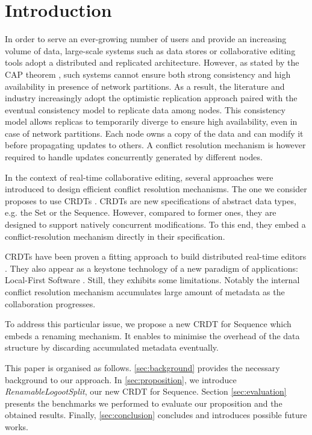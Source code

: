 \documentclass[sigplan,10pt]{acmart}
\begin{document}
\section{Introduction}

In order to serve an ever-growing number of users and provide an increasing volume of data, large-scale systems such as data stores or collaborative editing tools adopt a distributed and replicated architecture.
However, as stated by the CAP theorem \cite{brewer_2000_podc}, such systems cannot ensure both strong consistency and high availability in presence of network partitions.
As a result, the literature and industry increasingly adopt the optimistic replication approach \cite{10.1145/1057977.1057980} paired with the eventual consistency model \cite{10.1145/224057.224070} to replicate data among nodes.
This consistency model allows replicas to temporarily diverge to ensure high availability, even in case of network partitions.
Each node owns a copy of the data and can modify it before propagating updates to others.
A conflict resolution mechanism is however required to handle updates concurrently generated by different nodes.

In the context of real-time collaborative editing, several approaches were introduced to design efficient conflict resolution mechanisms.
The one we consider proposes to use \acfp{CRDT} \cite{shapiro_2011_crdt}.
\acp{CRDT} are new specifications of abstract data types, e.g. the Set or the Sequence.
However, compared to former ones, they are designed to support natively concurrent modifications.
To this end, they embed a conflict-resolution mechanism directly in their specification.

\acp{CRDT} have been proven a fitting approach to build distributed real-time editors \cite{doi:10.1002/cpe.4108}.
They also appear as a keystone technology of a new paradigm of applications: Local-First Software \cite{10.1145/3359591.3359737}.
Still, they exhibits some limitations.
Notably the internal conflict resolution mechanism accumulates large amount of metadata as the collaboration progresses.

To address this particular issue, we propose a new \ac{CRDT} for Sequence which embeds a renaming mechanism.
It enables to minimise the overhead of the data structure by discarding accumulated metadata eventually.


This paper is organised as follows.
\autoref{sec:background} provides the necessary background to our approach.
In \autoref{sec:proposition}, we introduce \emph{RenamableLogootSplit}, our new \ac{CRDT} for Sequence.
Section \ref{sec:evaluation} presents the benchmarks we performed to evaluate our proposition and the obtained results.
Finally, \autoref{sec:conclusion} concludes and introduces possible future works.
\end{document}
